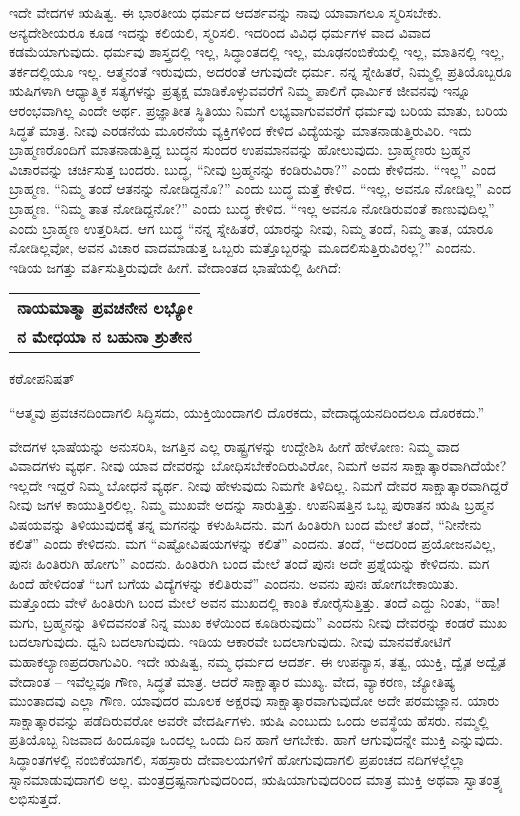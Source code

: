 ಇದೇ ವೇದಗಳ ಋಷಿತ್ವ. ಈ ಭಾರತೀಯ ಧರ್ಮದ ಆದರ್ಶವನ್ನು ನಾವು ಯಾವಾಗಲೂ ಸ್ಮರಿಸಬೇಕು. ಅನ್ಯದೇಶೀಯರೂ ಕೂಡ ಇದನ್ನು ಕಲಿಯಲಿ, ಸ್ಮರಿಸಲಿ. ಇದರಿಂದ ವಿವಿಧ ಧರ್ಮಗಳ ವಾದ ವಿವಾದ ಕಡಮೆಯಾಗುವುದು. ಧರ್ಮವು ಶಾಸ್ತ್ರದಲ್ಲಿ ಇಲ್ಲ, ಸಿದ್ಧಾಂತದಲ್ಲಿ ಇಲ್ಲ, ಮೂಢನಂಬಿಕೆಯಲ್ಲಿ ಇಲ್ಲ, ಮಾತಿನಲ್ಲಿ ಇಲ್ಲ, ತರ್ಕದಲ್ಲಿಯೂ ಇಲ್ಲ. ಆತ್ಮನಂತೆ ಇರುವುದು, ಅದರಂತೆ ಆಗುವುದೇ ಧರ್ಮ. ನನ್ನ ಸ್ನೇಹಿತರೆ, ನಿಮ್ಮಲ್ಲಿ ಪ್ರತಿಯೊಬ್ಬರೂ ಋಷಿಗಳಾಗಿ ಆಧ್ಯಾತ್ಮಿಕ ಸತ್ಯಗಳನ್ನು ಪ್ರತ್ಯಕ್ಷ ಮಾಡಿಕೊಳ್ಳುವವರೆಗೆ ನಿಮ್ಮ ಪಾಲಿಗೆ ಧಾರ್ಮಿಕ ಜೀವನವು ಇನ್ನೂ ಆರಂಭವಾಗಿಲ್ಲ ಎಂದೇ ಅರ್ಥ. ಪ್ರಜ್ಞಾತೀತ ಸ್ಥಿತಿಯು ನಿಮಗೆ ಲಭ್ಯವಾಗುವವರೆಗೆ ಧರ್ಮವು ಬರಿಯ ಮಾತು, ಬರಿಯ ಸಿದ್ಧತೆ ಮಾತ್ರ. ನೀವು ಎರಡನೆಯ ಮೂರನೆಯ ವ್ಯಕ್ತಿಗಳಿಂದ ಕೇಳಿದ ವಿದ್ಯೆಯನ್ನು ಮಾತನಾಡುತ್ತಿರುವಿರಿ. ಇದು ಬ್ರಾಹ್ಮಣರೊಂದಿಗೆ ಮಾತನಾಡುತ್ತಿದ್ದ ಬುದ್ಧನ ಸುಂದರ ಉಪಮಾನವನ್ನು ಹೋಲುವುದು. ಬ್ರಾಹ್ಮಣರು ಬ್ರಹ್ಮನ ವಿಚಾರವನ್ನು ಚರ್ಚಿಸುತ್ತ ಬಂದರು. ಬುದ್ಧ, “ನೀವು ಬ್ರಹ್ಮನನ್ನು ಕಂಡಿರುವಿರಾ?” ಎಂದು ಕೇಳಿದನು. “ಇಲ್ಲ” ಎಂದ ಬ್ರಾಹ್ಮಣ. “ನಿಮ್ಮ ತಂದೆ ಆತನನ್ನು ನೋಡಿದ್ದನೊ?” ಎಂದು ಬುದ್ಧ ಮತ್ತೆ ಕೇಳಿದ. “ಇಲ್ಲ, ಅವನೂ ನೋಡಿಲ್ಲ” ಎಂದ ಬ್ರಾಹ್ಮಣ. “ನಿಮ್ಮ ತಾತ ನೋಡಿದ್ದನೋ?” ಎಂದು ಬುದ್ಧ ಕೇಳಿದ. “ಇಲ್ಲ ಅವನೂ ನೋಡಿರುವಂತೆ ಕಾಣುವುದಿಲ್ಲ” ಎಂದು ಬ್ರಾಹ್ಮಣ ಉತ್ತರಿಸಿದ. ಆಗ ಬುದ್ಧ “ನನ್ನ ಸ್ನೇಹಿತರೆ, ಯಾರನ್ನು ನೀವು, ನಿಮ್ಮ ತಂದೆ, ನಿಮ್ಮ ತಾತ, ಯಾರೂ ನೋಡಿಲ್ಲವೋ, ಅವನ ವಿಚಾರ ವಾದಮಾಡುತ್ತ ಒಬ್ಬರು ಮತ್ತೊಬ್ಬರನ್ನು ಮೂದಲಿಸುತ್ತಿರುವಿರಲ್ಲ?” ಎಂದನು. ಇಡಿಯ ಜಗತ್ತು ವರ್ತಿಸುತ್ತಿರುವುದೇ ಹೀಗೆ. ವೇದಾಂತದ ಭಾಷೆಯಲ್ಲಿ ಹೀಗಿದೆ:

\begin{longtable}{@{}l@{}}
\textbf{ನಾಯಮಾತ್ಮಾ ಪ್ರವಚನೇನ ಲಭ್ಯೋ} \\
\textbf{ನ ಮೇಧಯಾ ನ ಬಹುನಾ ಶ್ರುತೇನ} \\
\end{longtable}

\hfill ಕಠೋಪನಿಷತ್​

“ಆತ್ಮವು ಪ್ರವಚನದಿಂದಾಗಲಿ ಸಿದ್ಧಿಸದು, ಯುಕ್ತಿಯಿಂದಾಗಲಿ ದೊರಕದು, ವೇದಾಧ್ಯಯನದಿಂದಲೂ ದೊರಕದು.” 

ವೇದಗಳ ಭಾಷೆಯನ್ನು ಅನುಸರಿಸಿ, ಜಗತ್ತಿನ ಎಲ್ಲ ರಾಷ್ಟ್ರಗಳನ್ನು ಉದ್ದೇಶಿಸಿ ಹೀಗೆ ಹೇಳೋಣ: ನಿಮ್ಮ ವಾದ ವಿವಾದಗಳು ವ್ಯರ್ಥ. ನೀವು ಯಾವ ದೇವರನ್ನು ಬೋಧಿಸಬೇಕೆಂದಿರುವಿರೋ, ನಿಮಗೆ ಅವನ ಸಾಕ್ಷಾತ್ಕಾರವಾಗಿದೆಯೇ? ಇಲ್ಲದೇ ಇದ್ದರೆ ನಿಮ್ಮ ಬೋಧನೆ ವ್ಯರ್ಥ. ನೀವು ಹೇಳುವುದು ನಿಮಗೇ ತಿಳಿದಿಲ್ಲ. ನಿಮಗೆ ದೇವರ ಸಾಕ್ಷಾತ್ಕಾರವಾಗಿದ್ದರೆ ನೀವು ಜಗಳ ಕಾಯುತ್ತಿರಲಿಲ್ಲ. ನಿಮ್ಮ ಮುಖವೇ ಅದನ್ನು ಸಾರುತ್ತಿತ್ತು. ಉಪನಿಷತ್ತಿನ ಒಬ್ಬ ಪುರಾತನ ಋಷಿ ಬ್ರಹ್ಮನ ವಿಷಯವನ್ನು ತಿಳಿಯುವುದಕ್ಕೆ ತನ್ನ ಮಗನನ್ನು ಕಳುಹಿಸಿದನು. ಮಗ ಹಿಂತಿರುಗಿ ಬಂದ ಮೇಲೆ ತಂದೆ, “ನೀನೇನು ಕಲಿತೆ” ಎಂದು ಕೇಳಿದನು. ಮಗ “ಎಷ್ಟೋ\break ವಿಷಯಗಳನ್ನು ಕಲಿತೆ” ಎಂದನು. ತಂದೆ, “ಅದರಿಂದ ಪ್ರಯೋಜನವಿಲ್ಲ, ಪುನಃ ಹಿಂತಿರುಗಿ ಹೋಗು” ಎಂದನು. ಹಿಂತಿರುಗಿ ಬಂದ ಮೇಲೆ ತಂದೆ ಪುನಃ ಅದೇ ಪ್ರಶ್ನೆಯನ್ನು ಕೇಳಿದನು. ಮಗ ಹಿಂದೆ ಹೇಳಿದಂತೆ “ಬಗೆ ಬಗೆಯ ವಿದ್ಯೆಗಳನ್ನು ಕಲಿತಿರುವೆ” ಎಂದನು. ಅವನು ಪುನಃ ಹೋಗಬೇಕಾಯಿತು. ಮತ್ತೊಂದು ವೇಳೆ ಹಿಂತಿರುಗಿ ಬಂದ ಮೇಲೆ ಅವನ ಮುಖದಲ್ಲಿ ಕಾಂತಿ ಕೋರೈಸುತ್ತಿತ್ತು. ತಂದೆ ಎದ್ದು ನಿಂತು, “ಹಾ! ಮಗು, ಬ್ರಹ್ಮನನ್ನು ತಿಳಿದವನಂತೆ ನಿನ್ನ ಮುಖ ಕಳೆಯಿಂದ ಕೂಡಿರುವುದು” ಎಂದನು ನೀವು ದೇವರನ್ನು ಕಂಡರೆ ಮುಖ ಬದಲಾಗುವುದು. ಧ್ವನಿ ಬದಲಾಗುವುದು. ಇಡಿಯ ಆಕಾರವೇ ಬದಲಾಗುವುದು. ನೀವು ಮಾನವಕೋಟಿಗೆ ಮಹಾಕಲ್ಯಾಣಪ್ರದರಾಗುವಿರಿ. ಇದೇ ಋಷಿತ್ವ, ನಮ್ಮ ಧರ್ಮದ ಆದರ್ಶ. ಈ ಉಪನ್ಯಾಸ, ತತ್ವ, ಯುಕ್ತಿ, ದ್ವೈತ ಅದ್ವೈತ ವೇದಾಂತ – ಇವೆಲ್ಲವೂ ಗೌಣ, ಸಿದ್ಧತೆ ಮಾತ್ರ. ಆದರೆ ಸಾಕ್ಷಾತ್ಕಾರ ಮುಖ್ಯ. ವೇದ, ವ್ಯಾಕರಣ, ಜ್ಯೋತಿಷ್ಯ ಮುಂತಾದವು ಎಲ್ಲಾ ಗೌಣ. ಯಾವುದರ ಮೂಲಕ ಅಕ್ಷರವು ಸಾಕ್ಷಾತ್ಕಾರವಾಗುವುದೋ ಅದೇ ಪರಮಜ್ಞಾನ. ಯಾರು ಸಾಕ್ಷಾತ್ಕಾರವನ್ನು ಪಡೆದಿರುವರೋ ಅವರೇ ವೇದರ್ಷಿಗಳು. ಋಷಿ ಎಂಬುದು ಒಂದು ಅವಸ್ಥೆಯ ಹೆಸರು. ನಮ್ಮಲ್ಲಿ ಪ್ರತಿಯೊಬ್ಬ ನಿಜವಾದ ಹಿಂದೂವೂ ಒಂದಲ್ಲ ಒಂದು ದಿನ ಹಾಗೆ ಆಗಬೇಕು. ಹಾಗೆ ಆಗುವುದನ್ನೇ ಮುಕ್ತಿ ಎನ್ನುವುದು. ಸಿದ್ಧಾಂತಗಳಲ್ಲಿ ನಂಬಿಕೆಯಾಗಲಿ, ಸಹಸ್ರಾರು ದೇವಾಲಯಗಳಿಗೆ ಹೋಗುವುದಾಗಲಿ ಪ್ರಪಂಚದ ನದಿಗಳಲ್ಲೆಲ್ಲಾ ಸ್ನಾನಮಾಡುವುದಾಗಲಿ ಅಲ್ಲ. ಮಂತ್ರದ್ರಷ್ಟನಾಗುವುದರಿಂದ, ಋಷಿಯಾಗುವುದರಿಂದ ಮಾತ್ರ ಮುಕ್ತಿ ಅಥವಾ ಸ್ವಾತಂತ್ರ್ಯ ಲಭಿಸುತ್ತದೆ. 

